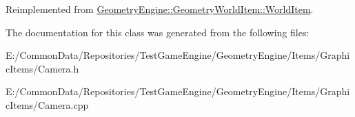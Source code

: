 Reimplemented from \mbox{\hyperlink{class_geometry_engine_1_1_geometry_world_item_1_1_world_item_a86effd24c41c87be8925ee3addd8c33d}{Geometry\+Engine\+::\+Geometry\+World\+Item\+::\+World\+Item}}.



The documentation for this class was generated from the following files\+:\begin{DoxyCompactItemize}
\item 
E\+:/\+Common\+Data/\+Repositories/\+Test\+Game\+Engine/\+Geometry\+Engine/\+Items/\+Graphic\+Items/Camera.\+h\item 
E\+:/\+Common\+Data/\+Repositories/\+Test\+Game\+Engine/\+Geometry\+Engine/\+Items/\+Graphic\+Items/Camera.\+cpp\end{DoxyCompactItemize}
